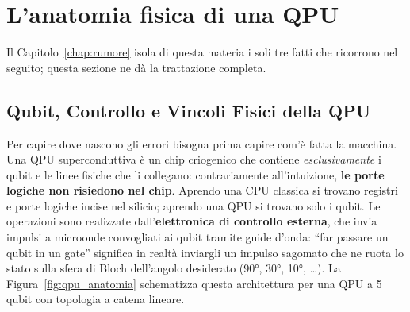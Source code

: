 \section{L'anatomia fisica di una QPU}
\label{app:anatomia}

Il Capitolo~\ref{chap:rumore} isola di questa materia i soli tre fatti che ricorrono nel
seguito; questa sezione ne d\`a la trattazione completa.

\subsection{Qubit, Controllo e Vincoli Fisici della QPU}

Per capire dove nascono gli errori bisogna prima capire com'è fatta la macchina. Una \ac{QPU} superconduttiva è un chip criogenico che contiene \emph{esclusivamente} i qubit e le linee fisiche che li collegano: contrariamente all'intuizione, \textbf{le porte logiche non risiedono nel chip}. Aprendo una CPU classica si trovano registri e porte logiche incise nel silicio; aprendo una QPU si trovano solo i qubit. Le operazioni sono realizzate dall'\textbf{elettronica di controllo esterna}, che invia impulsi a microonde convogliati ai qubit tramite guide d'onda: ``far passare un qubit in un gate'' significa in realtà inviargli un impulso sagomato che ne ruota lo stato sulla sfera di Bloch dell'angolo desiderato (90°, 30°, 10°, \ldots). La Figura~\ref{fig:qpu_anatomia} schematizza questa architettura per una QPU a 5 qubit con topologia a catena lineare.

